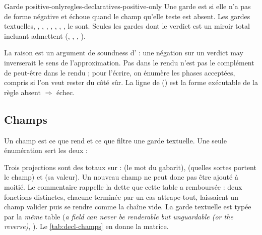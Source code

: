 \begin{definition}{Garde positive-only}{regles-declaratives-positive-only}
Une garde est  si elle n'a pas de forme négative et échoue quand le champ qu'elle teste est absent. Les gardes textuelles, , , , , , , ,  le sont. Seules les gardes dont le verdict est un miroir total incluant  admettent  (, , , ).
\end{definition}

La raison est un argument de soundness d' : une négation sur un verdict may inverserait le sens de l'approximation. \og Pas dans le rendu\fg{} n'est pas le complément de \og peut-être dans le rendu\fg{} ; pour l'écrire, on énumère les phases acceptées,  compris si l'on veut rester du côté sûr. La ligne  de  () est la forme exécutable de la règle \og absent $\Rightarrow$ échec\fg{}.

\subsection{Champs}

Un champ est ce que rend  et ce que filtre une garde textuelle. Une seule énumération sert les deux :


Trois projections sont des  totaux sur  :  (le mot du gabarit),  (quelles sortes portent le champ) et  (sa valeur). Un nouveau champ ne peut donc pas être ajouté à moitié. Le commentaire rappelle la dette que cette table a remboursée : deux fonctions distinctes, chacune terminée par un cas \og attrape-tout\fg{}, laissaient un champ valider puis se rendre comme la chaîne vide. La garde textuelle est typée par la \emph{même} table (\og \emph{a field can never be renderable but unguardable (or the reverse)}\fg{}, ). Le \cref{tab:decl-champs} en donne la matrice.


